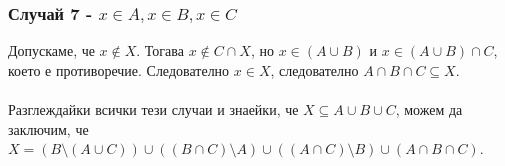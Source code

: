 \documentclass[12pt]{article}
\begin{document}
\subsubsection*{Случай 7 - $x \in A, x \in B, x \in C$}
Допускаме, че $x \not\in X$. Тогава $x \not\in C \cap X$, но $x \in (A \cup B)$ и $x \in (A \cup B) \cap C$, което е противоречие. Следователно $x \in X$, следователно $A \cap B \cap C \subseteq X$.

\paragraph*{}
Разглеждайки всички тези случаи и знаейки, че $X \subseteq A \cup B \cup C$, можем да заключим, че $X = (B \setminus (A \cup C)) \cup ((B \cap C) \setminus A) \cup ((A \cap C) \setminus B) \cup (A \cap B \cap C)$.
\end{document}
